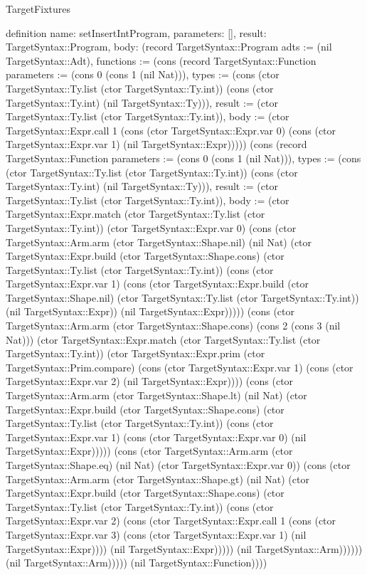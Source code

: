 \begin{lexlean}{TargetFixtures}
\begin{semanticmodule}
definition{
  name: setInsertIntProgram,
  parameters: [],
  result: TargetSyntax::Program,
  body: (record TargetSyntax::Program {adts := (nil TargetSyntax::Adt), functions := (cons (record TargetSyntax::Function {parameters := (cons 0 (cons 1 (nil Nat))), types := (cons (ctor TargetSyntax::Ty.list (ctor TargetSyntax::Ty.int)) (cons (ctor TargetSyntax::Ty.int) (nil TargetSyntax::Ty))), result := (ctor TargetSyntax::Ty.list (ctor TargetSyntax::Ty.int)), body := (ctor TargetSyntax::Expr.call 1 (cons (ctor TargetSyntax::Expr.var 0) (cons (ctor TargetSyntax::Expr.var 1) (nil TargetSyntax::Expr))))}) (cons (record TargetSyntax::Function {parameters := (cons 0 (cons 1 (nil Nat))), types := (cons (ctor TargetSyntax::Ty.list (ctor TargetSyntax::Ty.int)) (cons (ctor TargetSyntax::Ty.int) (nil TargetSyntax::Ty))), result := (ctor TargetSyntax::Ty.list (ctor TargetSyntax::Ty.int)), body := (ctor TargetSyntax::Expr.match (ctor TargetSyntax::Ty.list (ctor TargetSyntax::Ty.int)) (ctor TargetSyntax::Expr.var 0) (cons (ctor TargetSyntax::Arm.arm (ctor TargetSyntax::Shape.nil) (nil Nat) (ctor TargetSyntax::Expr.build (ctor TargetSyntax::Shape.cons) (ctor TargetSyntax::Ty.list (ctor TargetSyntax::Ty.int)) (cons (ctor TargetSyntax::Expr.var 1) (cons (ctor TargetSyntax::Expr.build (ctor TargetSyntax::Shape.nil) (ctor TargetSyntax::Ty.list (ctor TargetSyntax::Ty.int)) (nil TargetSyntax::Expr)) (nil TargetSyntax::Expr))))) (cons (ctor TargetSyntax::Arm.arm (ctor TargetSyntax::Shape.cons) (cons 2 (cons 3 (nil Nat))) (ctor TargetSyntax::Expr.match (ctor TargetSyntax::Ty.list (ctor TargetSyntax::Ty.int)) (ctor TargetSyntax::Expr.prim (ctor TargetSyntax::Prim.compare) (cons (ctor TargetSyntax::Expr.var 1) (cons (ctor TargetSyntax::Expr.var 2) (nil TargetSyntax::Expr)))) (cons (ctor TargetSyntax::Arm.arm (ctor TargetSyntax::Shape.lt) (nil Nat) (ctor TargetSyntax::Expr.build (ctor TargetSyntax::Shape.cons) (ctor TargetSyntax::Ty.list (ctor TargetSyntax::Ty.int)) (cons (ctor TargetSyntax::Expr.var 1) (cons (ctor TargetSyntax::Expr.var 0) (nil TargetSyntax::Expr))))) (cons (ctor TargetSyntax::Arm.arm (ctor TargetSyntax::Shape.eq) (nil Nat) (ctor TargetSyntax::Expr.var 0)) (cons (ctor TargetSyntax::Arm.arm (ctor TargetSyntax::Shape.gt) (nil Nat) (ctor TargetSyntax::Expr.build (ctor TargetSyntax::Shape.cons) (ctor TargetSyntax::Ty.list (ctor TargetSyntax::Ty.int)) (cons (ctor TargetSyntax::Expr.var 2) (cons (ctor TargetSyntax::Expr.call 1 (cons (ctor TargetSyntax::Expr.var 3) (cons (ctor TargetSyntax::Expr.var 1) (nil TargetSyntax::Expr)))) (nil TargetSyntax::Expr))))) (nil TargetSyntax::Arm)))))) (nil TargetSyntax::Arm))))}) (nil TargetSyntax::Function)))})
}


\end{semanticmodule}
\end{lexlean}
